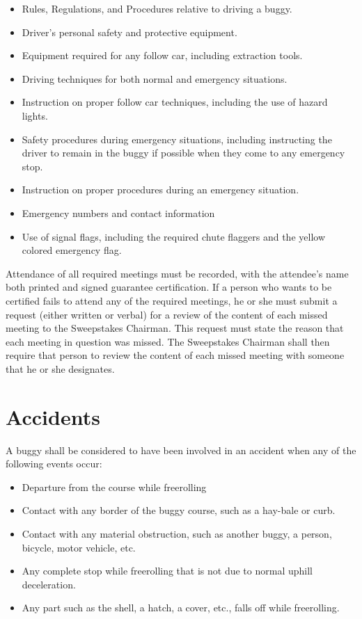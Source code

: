 	\begin{itemize}
		\item Rules, Regulations, and Procedures relative to driving a buggy.
		\item Driver's personal safety and protective equipment.
		\item Equipment required for any follow car, including extraction tools.
		\item Driving techniques for both normal and emergency situations.
		\item Instruction on proper follow car techniques, including the use of hazard lights.
		\item Safety procedures during emergency situations, including instructing the driver to remain in the buggy if possible when they come to any emergency stop.
		\item Instruction on proper procedures during an emergency situation.
		\item Emergency numbers and contact information
		\item Use of signal flags, including the required chute flaggers and the yellow colored emergency flag. 
	\end{itemize}

	
	Attendance of all required meetings must be recorded, with the attendee's name 
	both printed and signed guarantee certification. If a person who wants to be 
	certified fails to attend any of the required meetings, he or she must submit 
	a request (either written or verbal) for a review of the content of each 
	missed meeting to the Sweepstakes Chairman. This request must state the reason
	that each meeting in question was missed. The Sweepstakes Chairman shall then 
	require that person to review the content of each missed meeting with someone 
	that he or she designates. 

\section{Accidents}

	\noindent A buggy shall be considered to have been involved in an accident when any of the following events occur:

	\begin{itemize}

		\item Departure from the course while freerolling

		\item Contact with any border of the buggy course, such as a hay-bale or curb.

		\item Contact with any material obstruction, such as another buggy, a person, bicycle, motor vehicle, etc.

		\item Any complete stop while freerolling that is not due to normal uphill deceleration.

		\item Any part such as the shell, a hatch, a cover, etc., falls	off while freerolling.

	\end{itemize}


